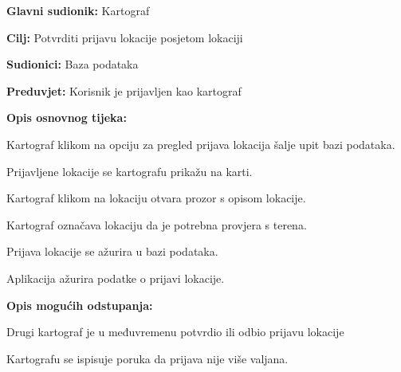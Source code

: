 					
	
					

				
				\noindent {}
				\begin{packed_item}
					
					\item \textbf{Glavni sudionik: }Kartograf
					\item  \textbf{Cilj:} Potvrditi prijavu lokacije posjetom lokaciji
					\item  \textbf{Sudionici:} Baza podataka
					\item  \textbf{Preduvjet:} Korisnik je prijavljen kao kartograf
					\item  \textbf{Opis osnovnog tijeka:}
					
					\item[] \begin{packed_enum}
						
						\item Kartograf klikom na opciju za pregled prijava lokacija šalje upit bazi podataka.
						\item Prijavljene lokacije se kartografu prikažu na karti.
						\item Kartograf klikom na lokaciju otvara prozor s opisom lokacije.
						\item Kartograf označava lokaciju da je potrebna provjera s terena.
						\item Prijava lokacije se ažurira u bazi podataka.
						\item Aplikacija ažurira podatke o prijavi lokacije.
					\end{packed_enum}
					
					\item  \textbf{Opis mogućih odstupanja:}
					
					\item[] \begin{packed_item}
						
						\item[5.a] Drugi kartograf je u međuvremenu potvrdio ili odbio prijavu lokacije
						\item[] \begin{packed_enum}
							
							\item Kartografu se ispisuje poruka da prijava nije više valjana.
							
						\end{packed_enum}
						
					\end{packed_item}
				\end{packed_item}
				
